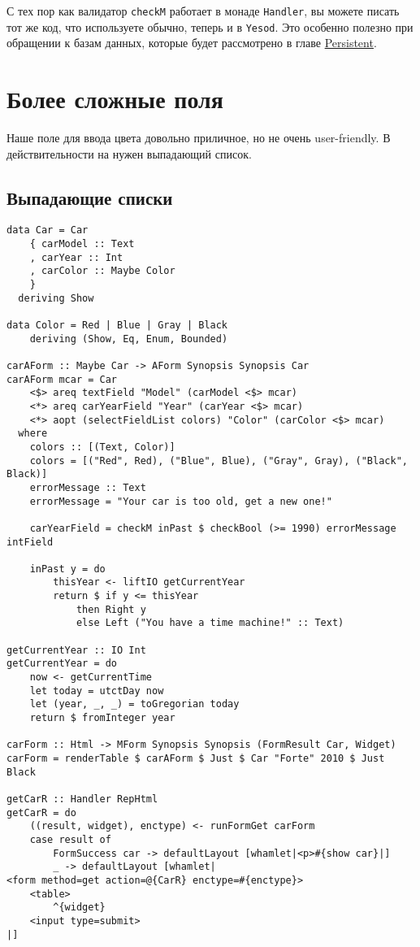 \begin{remark}
С тех пор как валидатор \lstinline'checkM' работает в монаде \lstinline'Handler', вы
можете писать тот же код, что используете обычно, теперь и в \lstinline'Yesod'. Это 
особенно полезно при обращении к базам данных, которые будет рассмотрено в главе
\hyperref[ch:persistent]{Persistent}.
\end{remark}

\section{Более сложные поля}
Наше поле для ввода цвета довольно приличное, но не очень user-friendly. В
действительности на нужен выпадающий список.

\subsection{Выпадающие списки}

\begin{lstlisting}
data Car = Car
    { carModel :: Text
    , carYear :: Int
    , carColor :: Maybe Color
    }
  deriving Show

data Color = Red | Blue | Gray | Black
    deriving (Show, Eq, Enum, Bounded)

carAForm :: Maybe Car -> AForm Synopsis Synopsis Car
carAForm mcar = Car
    <$> areq textField "Model" (carModel <$> mcar)
    <*> areq carYearField "Year" (carYear <$> mcar)
    <*> aopt (selectFieldList colors) "Color" (carColor <$> mcar)
  where
    colors :: [(Text, Color)]
    colors = [("Red", Red), ("Blue", Blue), ("Gray", Gray), ("Black", Black)]
    errorMessage :: Text
    errorMessage = "Your car is too old, get a new one!"

    carYearField = checkM inPast $ checkBool (>= 1990) errorMessage intField

    inPast y = do
        thisYear <- liftIO getCurrentYear
        return $ if y <= thisYear
            then Right y
            else Left ("You have a time machine!" :: Text)

getCurrentYear :: IO Int
getCurrentYear = do
    now <- getCurrentTime
    let today = utctDay now
    let (year, _, _) = toGregorian today
    return $ fromInteger year

carForm :: Html -> MForm Synopsis Synopsis (FormResult Car, Widget)
carForm = renderTable $ carAForm $ Just $ Car "Forte" 2010 $ Just Black

getCarR :: Handler RepHtml
getCarR = do
    ((result, widget), enctype) <- runFormGet carForm
    case result of
        FormSuccess car -> defaultLayout [whamlet|<p>#{show car}|]
        _ -> defaultLayout [whamlet|
<form method=get action=@{CarR} enctype=#{enctype}>
    <table>
        ^{widget}
    <input type=submit>
|]
\end{lstlisting}

